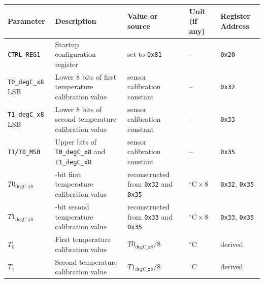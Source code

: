 \begin{table}[H]
	\centering
	\begin{tabularx}{\textwidth}{|>{\raggedright\arraybackslash}X|>{\raggedright\arraybackslash}X|>{\raggedright\arraybackslash}p{2.7cm}|>{\raggedright\arraybackslash}p{2.2cm}|>{\raggedright\arraybackslash}p{3cm}|}
		\hline
		\textbf{Parameter}        & \textbf{Description}                                          & \textbf{Value or source}                           & \textbf{Unit (if any)}       & \textbf{Register Address}    \\ \hline
		\texttt{CTRL\_REG1}       & Startup configuration register                                & set to \texttt{0x81}                               & --                           & \texttt{0x20}                \\ \hline
		\texttt{T0\_degC\_x8} LSB & Lower 8 bits of first temperature calibration value           & sensor calibration constant                        & --                           & \texttt{0x32}                \\ \hline
		\texttt{T1\_degC\_x8} LSB & Lower 8 bits of second temperature calibration value          & sensor calibration constant                        & --                           & \texttt{0x33}                \\ \hline
		\texttt{T1/T0\_MSB}       & Upper bits of \texttt{T0\_degC\_x8} and \texttt{T1\_degC\_x8} & sensor calibration constant                        & --                           & \texttt{0x35}                \\ \hline
		\(T0_{\mathrm{degC\_x8}}\) & 10-bit first temperature calibration value                    & reconstructed from \texttt{0x32} and \texttt{0x35} & \(^\circ\mathrm{C}\times 8\) & \texttt{0x32}, \texttt{0x35} \\ \hline
		\(T1_{\mathrm{degC\_x8}}\) & 10-bit second temperature calibration value                   & reconstructed from \texttt{0x33} and \texttt{0x35} & \(^\circ\mathrm{C}\times 8\) & \texttt{0x33}, \texttt{0x35} \\ \hline
		\(T_0\)                   & First temperature calibration value                           & \(T0_{\mathrm{degC\_x8}}/8\)                        & \(^\circ\mathrm{C}\)         & derived                      \\ \hline
		\(T_1\)                   & Second temperature calibration value                          & \(T1_{\mathrm{degC\_x8}}/8\)                        & \(^\circ\mathrm{C}\)         & derived                      \\ \hline

\end{tabularx}
\end{table}
